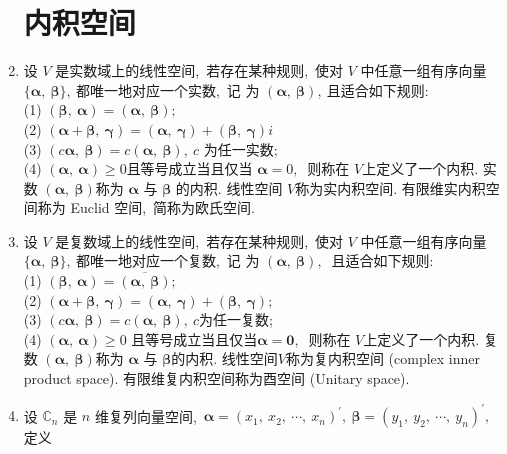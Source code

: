 \begin{enumerate}
		\section{内积空间}
		\item 设  $V$  是实数域上的线性空间,\  若存在某种规则,\  使对 $ V $ 中任意一组有序向量 $ \{\boldsymbol{\alpha},\  \boldsymbol{\beta}\} ,\  $都唯一地对应一个实数,\  记 为  $(\boldsymbol{\alpha},\  \boldsymbol{\beta}) ,\  $且适合如下规则:\\
		(1) $ (\boldsymbol{\beta},\  \boldsymbol{\alpha})=(\boldsymbol{\alpha},\  \boldsymbol{\beta}) ;$\\
		(2) $ (\boldsymbol{\alpha}+\boldsymbol{\beta},\  \boldsymbol{\gamma})=(\boldsymbol{\alpha},\  \boldsymbol{\gamma})+(\boldsymbol{\beta},\  \boldsymbol{\gamma})  i$\\
		(3) $ (c \boldsymbol{\alpha},\  \boldsymbol{\beta})=c(\boldsymbol{\alpha},\  \boldsymbol{\beta}),\  c$  为任一实数;\\
		(4)  $(\boldsymbol{\alpha},\ \boldsymbol{\alpha}) \geqslant 0  $且等号成立当且仅当 $ \boldsymbol{\alpha}=0 ,\ $
		则称在 $ V  $上定义了一个内积. 实数  $(\boldsymbol{\alpha},\  \boldsymbol{\beta})  $称为  $\boldsymbol{\alpha} $ 与  $\boldsymbol{\beta} $ 的内积. 线性空间 $ V  $称为实内积空间. 有限维实内积空 间称为 Euclid 空间,\  简称为欧氏空间.
		\item 设  $V$  是复数域上的线性空间,\  若存在某种规则,\  使对 $ V $ 中任意一组有序向量$  \{\boldsymbol{\alpha},\  \boldsymbol{\beta}\} ,\  $都唯一地对应一个复数,\  记 为  $(\boldsymbol{\alpha},\  \boldsymbol{\beta}) ,\ $ 且适合如下规则:\\
		(1) $ (\boldsymbol{\beta},\  \boldsymbol{\alpha})=\overline{(\boldsymbol{\alpha},\  \boldsymbol{\beta})} ;$\\
		(2) $ (\boldsymbol{\alpha}+\boldsymbol{\beta},\  \boldsymbol{\gamma})=(\boldsymbol{\alpha},\  \boldsymbol{\gamma})+(\boldsymbol{\beta},\  \boldsymbol{\gamma}) ;$\\
		(3)  $(c \boldsymbol{\alpha},\  \boldsymbol{\beta})=c(\boldsymbol{\alpha},\  \boldsymbol{\beta}),\  c  $为任一复数;\\
		(4) $ (\boldsymbol{\alpha},\  \boldsymbol{\alpha}) \geqslant 0$  且等号成立当且仅当$  \boldsymbol{\alpha}=\mathbf{0} ,\ $
		则称在  $V  $上定义了一个内积. 复数 $ (\boldsymbol{\alpha},\  \boldsymbol{\beta})  $称为 $ \boldsymbol{\alpha} $ 与  $\boldsymbol{\beta} $的内积. 线性空间$  V  $称为复内积空间 (complex inner product space). 有限维复内积空间称为酉空间 (Unitary space).
		\item 设 $ \mathbb{C}_{n}$  是  $n $ 维复列向量空间,\   $\boldsymbol{\alpha}=\left(x_{1},\  x_{2},\  \cdots,\  x_{n}\right)^{\prime},\  \boldsymbol{\beta}=   \left(y_{1},\  y_{2},\  \cdots,\  y_{n}\right)^{\prime} ,\  $定义

\end{enumerate}
